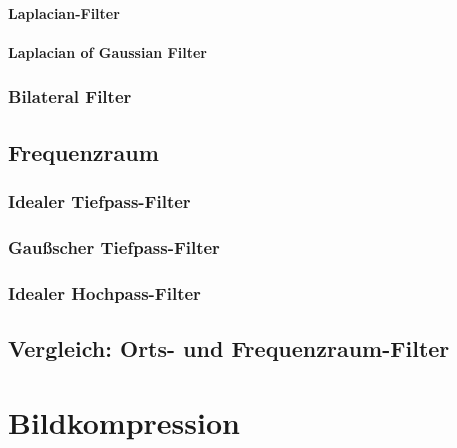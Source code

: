 \documentclass[a4paper, 11pt, accentcolor = tud3b]{tudreport}
\begin{document}
					\paragraph{Laplacian-Filter} %

					\paragraph{Laplacian of Gaussian Filter} %

				\subsubsection{Bilateral Filter} %

			\subsection{Frequenzraum} %

				\subsubsection{Idealer Tiefpass-Filter} %

				\subsubsection{Gaußscher Tiefpass-Filter} %

				\subsubsection{Idealer Hochpass-Filter} %

			\subsection{Vergleich: Orts- und Frequenzraum-Filter} %

		\section{Bildkompression} %
\end{document}

